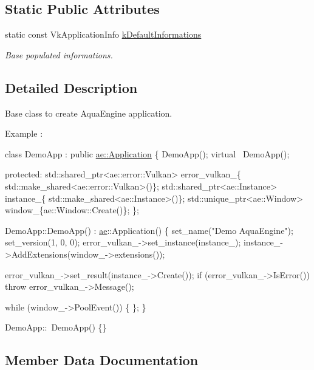 \subsection*{Static Public Attributes}
\begin{DoxyCompactItemize}
\item 
static const Vk\+Application\+Info \hyperlink{classae_1_1_application_a4c12a034bcd9b22ebe2c8770e62f9792}{k\+Default\+Informations}
\begin{DoxyCompactList}\small\item\em Base populated informations. \end{DoxyCompactList}\end{DoxyCompactItemize}


\subsection{Detailed Description}
Base class to create Aqua\+Engine application. 

Example \+:


\begin{DoxyCode}
\textcolor{keyword}{class }DemoApp : \textcolor{keyword}{public} \hyperlink{classae_1_1_application}{ae::Application} \{
    DemoApp();
    \textcolor{keyword}{virtual} ~DemoApp();

   \textcolor{keyword}{protected}:
    std::shared\_ptr<ae::error::Vulkan> error\_vulkan\_\{
        std::make\_shared<ae::error::Vulkan>()\};
    std::shared\_ptr<ae::Instance> instance\_\{
    std::make\_shared<ae::Instance>()\};
    std::unique\_ptr<ae::Window> window\_\{ae::Window::Create()\};
\};

DemoApp::DemoApp() : \hyperlink{namespaceae}{ae}::Application() \{
    set\_name(\textcolor{stringliteral}{"Demo AquaEngine"});
    set\_version(1, 0, 0);
    error\_vulkan\_->set\_instance(instance\_);
    instance\_->AddExtensions(window\_->extensions());

    error\_vulkan\_->set\_result(instance\_->Create());
    \textcolor{keywordflow}{if} (error\_vulkan\_->IsError()) \textcolor{keywordflow}{throw} error\_vulkan\_->Message();

    \textcolor{keywordflow}{while} (window\_->PoolEvent()) \{
    \};
\}

DemoApp::~DemoApp() \{\}
\end{DoxyCode}
 

\subsection{Member Data Documentation}
\hypertarget{classae_1_1_application_a4c12a034bcd9b22ebe2c8770e62f9792}{}\label{classae_1_1_application_a4c12a034bcd9b22ebe2c8770e62f9792} 
